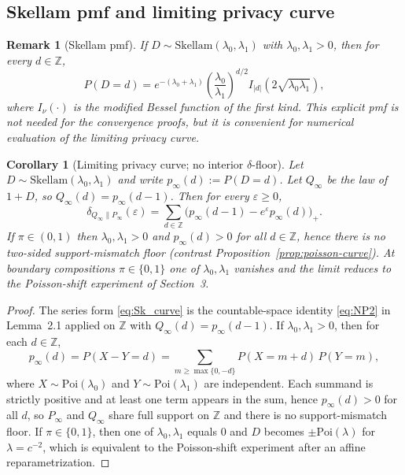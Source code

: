 \documentclass{article}
\newtheorem{corollary}[theorem]{Corollary}
\newtheorem{remark}[theorem]{Remark}
\begin{document}
\subsection{Skellam pmf and limiting privacy curve}

\begin{remark}[Skellam pmf]
If $D \sim \mathrm{Skellam}(\lambda_0, \lambda_1)$ with $\lambda_0, \lambda_1 > 0$, then for every $d \in \mathbb{Z}$,
\[
P(D = d) = e^{-(\lambda_0 + \lambda_1)} \left(\frac{\lambda_0}{\lambda_1}\right)^{d/2} I_{|d|}\!\left(2\sqrt{\lambda_0 \lambda_1}\right),
\]
where $I_\nu(\cdot)$ is the modified Bessel function of the first kind. This explicit pmf is not needed for the convergence
proofs, but it is convenient for numerical evaluation of the limiting privacy curve.
\end{remark}

\begin{corollary}[Limiting privacy curve; no interior $\delta$-floor]
\label{cor:skellam-curve}
Let $D \sim \mathrm{Skellam}(\lambda_0, \lambda_1)$ and write $p_\infty(d) := P(D = d)$. Let
$Q_\infty$ be the law of $1 + D$, so $Q_\infty(d) = p_\infty(d-1)$. Then for every
$\varepsilon \geq 0$,
\begin{equation}
\delta_{Q_\infty\|P_\infty}(\varepsilon) = \sum_{d \in \mathbb{Z}} \bigl(p_\infty(d-1) - e^\varepsilon p_\infty(d)\bigr)_+. \label{eq:Sk_curve}
\end{equation}
If $\pi \in (0,1)$ then $\lambda_0, \lambda_1 > 0$ and $p_\infty(d) > 0$ for all $d \in \mathbb{Z}$, hence there is no two-sided support-mismatch floor
(contrast Proposition~\ref{prop:poisson-curve}). At boundary compositions $\pi \in \{0,1\}$ one of $\lambda_0, \lambda_1$ vanishes and the limit reduces
to the Poisson-shift experiment of Section~3.
\end{corollary}

\begin{proof}
The series form \eqref{eq:Sk_curve} is the countable-space identity \eqref{eq:NP2} in Lemma~2.1 applied on $\mathbb{Z}$ with $Q_\infty(d) = p_\infty(d-1)$. If $\lambda_0, \lambda_1 > 0$, then for each $d \in \mathbb{Z}$,
\[
p_\infty(d) = P(X - Y = d) = \sum_{m \geq \max\{0,-d\}} P(X = m+d)\, P(Y = m),
\]
where $X \sim \mathrm{Poi}(\lambda_0)$ and $Y \sim \mathrm{Poi}(\lambda_1)$ are independent. Each summand is strictly positive and at least one
term appears in the sum, hence $p_\infty(d) > 0$ for all $d$, so $P_\infty$ and $Q_\infty$ share full support on $\mathbb{Z}$ and there is
no support-mismatch floor. If $\pi \in \{0,1\}$, then one of $\lambda_0, \lambda_1$ equals 0 and $D$ becomes $\pm\mathrm{Poi}(\lambda)$ for $\lambda = c^{-2}$,
which is equivalent to the Poisson-shift experiment after an affine reparametrization.
\end{proof}
\end{document}
